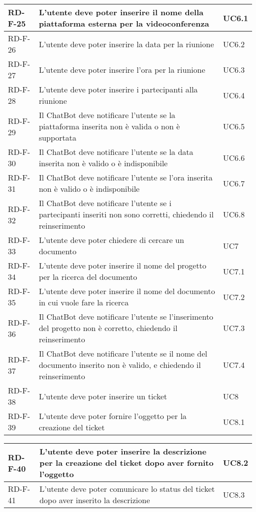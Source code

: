 \begin{center}
\begin{tabular}{ | m{8em} | m{18em} | m{12em} | }
\hline
RD-F-25&L’utente deve poter inserire il nome della piattaforma esterna per la videoconferenza &UC6.1 \\
\hline
RD-F-26&L’utente deve poter inserire la data per la riunione &UC6.2 \\
\hline
RD-F-27&L’utente deve poter inserire l’ora per la riunione &UC6.3 \\
\hline
RD-F-28&L’utente deve poter inserire i partecipanti alla riunione &UC6.4 \\
\hline
RD-F-29&Il ChatBot deve notificare l’utente se la piattaforma inserita non è valida o non è supportata &UC6.5 \\
\hline
RD-F-30&Il ChatBot deve notificare l’utente se la data inserita non è valido o è indisponibile &UC6.6 \\
\hline
RD-F-31&Il ChatBot deve notificare l’utente se l’ora inserita non è valido o è indisponibile &UC6.7 \\
\hline
RD-F-32&Il ChatBot deve notificare l’utente se i partecipanti inseriti non sono corretti, chiedendo il reinserimento &UC6.8 \\
\hline
RD-F-33&L’utente deve poter chiedere di cercare un documento &UC7 \\
\hline
RD-F-34&L’utente deve poter inserire il nome del progetto per la ricerca del documento &UC7.1 \\
\hline
RD-F-35&L’utente deve poter inserire il nome del documento in cui vuole fare la ricerca &UC7.2 \\
\hline
RD-F-36&Il ChatBot deve notificare l’utente se l’inserimento del progetto non è corretto, chiedendo il reinserimento &UC7.3\\
\hline
RD-F-37&Il ChatBot deve notificare l’utente se il nome del documento inserito non è valido, e chiedendo il reinserimento &UC7.4 \\
\hline
RD-F-38&L’utente deve poter inserire un ticket &UC8 \\
\hline
RD-F-39&L’utente deve poter fornire l’oggetto per la creazione del ticket &UC8.1 \\
\hline
\end{tabular}
\newpage
\begin{tabular}{ | m{8em} | m{18em} | m{12em} | }
\hline
RD-F-40&L’utente deve poter inserire la descrizione per la creazione del ticket dopo aver fornito l’oggetto &UC8.2 \\
\hline
RD-F-41&L’utente deve poter comunicare lo status del ticket dopo aver inserito la descrizione &UC8.3 \\

\end{tabular}
\end{center}
